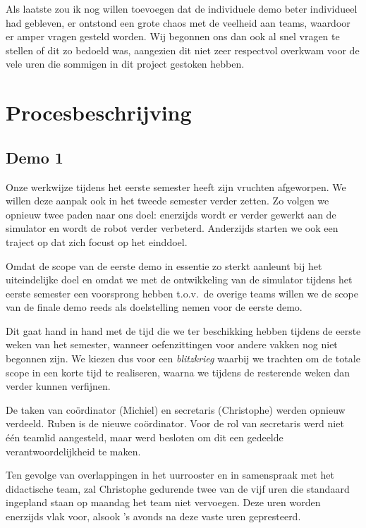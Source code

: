 \documentclass[12pt,a4paper]{report}
\begin{document}
Als laatste zou ik nog willen toevoegen dat de individuele demo beter individueel had gebleven, er ontstond een grote chaos met de veelheid aan teams, waardoor er amper vragen gesteld worden. Wij begonnen ons dan ook al snel vragen te stellen of dit zo bedoeld was, aangezien dit niet zeer respectvol overkwam voor de vele uren die sommigen in dit project gestoken hebben.

\chapter{Procesbeschrijving}
\label{ch:process}

\section{Demo 1}

Onze werkwijze tijdens het eerste semester heeft zijn vruchten afgeworpen. We willen deze aanpak ook in het tweede semester verder zetten. Zo volgen we opnieuw twee paden naar ons doel: enerzijds wordt er verder gewerkt aan de simulator en wordt de robot verder verbeterd. Anderzijds starten we ook een traject op dat zich focust op het einddoel.

Omdat de scope van de eerste demo in essentie zo sterkt aanleunt bij het uiteindelijke doel en omdat we met de ontwikkeling van de simulator tijdens het eerste semester een voorsprong hebben t.o.v.\ de overige teams willen we de scope van de finale demo reeds als doelstelling nemen voor de eerste demo.

Dit gaat hand in hand met de tijd die we ter beschikking hebben tijdens de eerste weken van het semester, wanneer oefenzittingen voor andere vakken nog niet begonnen zijn. We kiezen dus voor een \emph{blitzkrieg} waarbij we trachten om de totale scope in een korte tijd te realiseren, waarna we tijdens de resterende weken dan verder kunnen verfijnen.

De taken van co\"ordinator (Michiel) en secretaris (Christophe) werden opnieuw verdeeld. Ruben is de nieuwe co\"ordinator. Voor de rol van secretaris werd niet \'e\'en teamlid aangesteld, maar werd besloten om dit een gedeelde verantwoordelijkheid te maken.

Ten gevolge van overlappingen in het uurrooster en in samenspraak met het didactische team, zal Christophe gedurende twee van de vijf uren die standaard ingepland staan op maandag het team niet vervoegen. Deze uren worden enerzijds vlak voor, alsook 's avonds na deze vaste uren gepresteerd.
\end{document}
